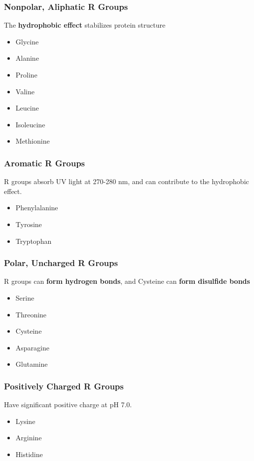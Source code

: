 \documentclass[10pt]{article}
\begin{document}
\subsubsection*{Nonpolar, Aliphatic R Groups}
The \textbf{hydrophobic effect} stabilizes protein structure
\begin{itemize}
    \item Glycine
    \item Alanine
    \item Proline
    \item Valine
    \item Leucine
    \item Isoleucine
    \item Methionine
\end{itemize}

\subsubsection*{Aromatic R Groups}
R groups absorb UV light at 270-280 nm, and can contribute to the hydrophobic effect.
\begin{itemize}
    \item Phenylalanine
    \item Tyrosine
    \item Tryptophan
\end{itemize}

\subsubsection*{Polar, Uncharged R Groups}
R groups can \textbf{form hydrogen bonds}, and Cysteine can \textbf{form disulfide bonds}
\begin{itemize}
    \item Serine
    \item Threonine
    \item Cysteine
    \item Asparagine
    \item Glutamine
\end{itemize}

\subsubsection*{Positively Charged R Groups}
Have significant positive charge at pH 7.0.
\begin{itemize}
    \item Lysine
    \item Arginine
    \item Histidine
\end{itemize}
\end{document}
